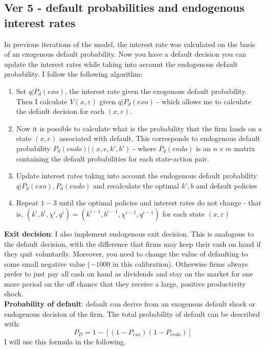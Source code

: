 \documentclass[12pt]{article}
\begin{document}
\subsection*{Ver 5 - default probabilities and endogenous interest rates}

In previous iterations of the model, the interest rate was calculated on the basis of an exogenous default probability. Now you have a default decision you can update the interest rates while taking into account the endogenous default probability. I follow the following algorithm: 
\begin{enumerate}
    \item Set $q|P_{d}(exo)$, the interest rate given the exogenous default probability. Then I calculate $V(x,\varepsilon)$ given $q|P_{d}(exo)$ - which allows me to calculate the default decision for each $(x,\varepsilon)$.
    \item Now it is possible to calculate what is the probability that the firm lands on a state $(x,e)$ associated with default. This corresponds to endogenous default probability $P_d(endo)|(x,e,k',b')$ - where $P_d(endo)$ is an $n \times m$ matrix containing the default probabilities for each state-action pair.
    \item Update interest rates taking into account the endogenous default probability $q|P_{d}(exo),P_{d}(endo)$ and recalculate the optimal $k',b$ and default policies
    \item Repeat $1-3$ until the optimal policies and interest rates do not change - that is, $ (k^{i},b^{i},\chi^{i},q^{i}) = (k^{i-1},b^{i-1},\chi^{i-1},q^{i-1}) $ for each state $(x,\varepsilon)$
\end{enumerate}
\textbf{Exit decision}: I also implement endogenous exit decision. This is analogous to the default decision, with the difference that firms may keep their cash on hand if they quit voluntarily. Moreover, you need to change the value of defaulting to some small negative value ($-1000$ in this calibration). Otherwise firms always prefer to just pay all cash on hand as dividends and stay on the market for one more period on the off chance that they receive a large, positive productivity shock. \vspace{3mm} \\
\textbf{Probability of default}: default can derive from an exogenous default shock or endogenous decision of the firm. The total probability of default can be described with:
$$             P_D = 1 - [(1 - P_{exo})(1 - P_{endo})]   $$ 
I will use this formula in the following.
\newpage
\setcounter{equation}{0}
\end{document}
